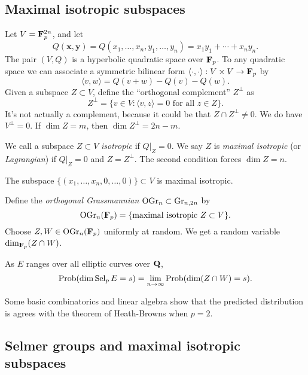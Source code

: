 \subsection{Maximal isotropic subspaces}

Let $V=\mathbf{F}_p^{2n}$, and let 
\[
  Q(\boldsymbol x,\boldsymbol y) = Q(x_1,\dots,x_n,y_1,\dots,y_n) = x_1 y_1 + \cdots + x_n y_n .
\]
The pair $(V,Q)$ is a hyperbolic quadratic space over $\mathbf{F}_p$. To any quadratic 
space we can associate a symmetric bilinear form 
$\langle \cdot,\cdot\rangle:V\times V\to \mathbf{F}_p$ by 
\[
  \langle v,w\rangle = Q(v+w)-Q(v)-Q(w) .
\]
Given a subspace $Z\subset V$, define the ``orthogonal complement'' $Z^\bot$ as 
\[
  Z^\bot = \{v\in V:\langle v,z\rangle = 0\text{ for all }z\in Z\} .
\]
It's not actually a complement, because it could be that $Z\cap Z^\bot \ne 0$. 
We do have $V^\bot = 0$. If $\dim Z=m$, then $\dim Z^\bot = 2 n-m$. 

We call a subspace $Z\subset V$ \emph{isotropic} if $Q|_Z=0$. We say $Z$ is 
\emph{maximal isotropic} (or \emph{Lagrangian}) if $Q|_Z=0$ and $Z=Z^\bot$. The 
second condition forces $\dim Z=n$. 

\begin{example}
The subspace $\{(x_1,\dots,x_n,0,\dots,0)\}\subset V$ is maximal isotropic. 
\end{example}

Define the \emph{orthogonal Grassmannian} 
$\operatorname{OGr}_n\subset \operatorname{Gr}_{n,2 n}$ by 
\[
  \operatorname{OGr}_n(\mathbf{F}_p) = \{\text{maximal isotropic }Z\subset V\} .
\]
Choose $Z,W\in \operatorname{OGr}_n(\mathbf{F}_p)$ uniformly at random. We get 
a random variable $\dim_{\mathbf{F}_p}(Z\cap W)$. 

\begin{conjecture}
As $E$ ranges over all elliptic curves over $\mathbf{Q}$, 
\[
  \operatorname{Prob}(\dim \operatorname{Sel}_p E=s) = \lim_{n\to \infty} \operatorname{Prob}(\dim(Z\cap W)=s) .
\]
\end{conjecture}

Some basic combinatorics and linear algebra show that the predicted 
distribution is agrees with the theorem of Heath-Browns when $p=2$. 





\subsection{Selmer groups and maximal isotropic subspaces}

